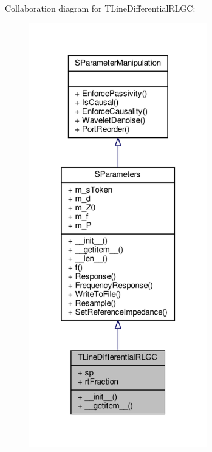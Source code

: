 Collaboration diagram for T\+Line\+Differential\+R\+L\+GC\+:
\nopagebreak
\begin{figure}[H]
\begin{center}
\leavevmode
\includegraphics[width=220pt]{classSignalIntegrity_1_1SParameters_1_1Devices_1_1TLineDifferentialRLGC_1_1TLineDifferentialRLGC__coll__graph}
\end{center}
\end{figure}
